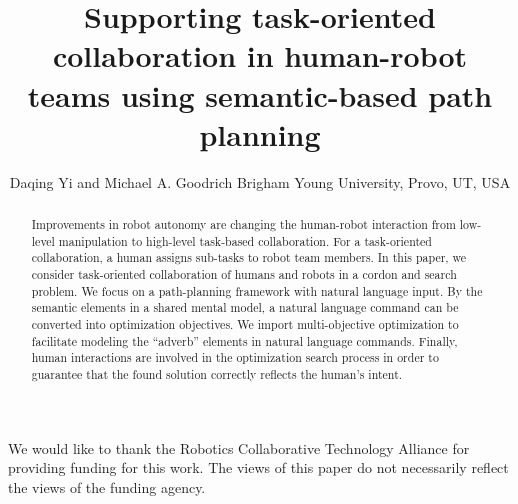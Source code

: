 \documentclass[]{spie}  %
\title{Supporting task-oriented collaboration in human-robot teams using semantic-based path planning}
\author{Daqing Yi and Michael A. Goodrich
\skiplinehalf
Brigham Young University, Provo, UT, USA 
}
\begin{document}
 
\maketitle

\begin{abstract}
Improvements in robot autonomy are changing the human-robot interaction from low-level manipulation to high-level task-based collaboration.
For a task-oriented collaboration, a human assigns sub-tasks to robot team members.
In this paper, we consider task-oriented collaboration of humans and robots in a cordon and search problem.
We focus on a path-planning framework with natural language input.
By the semantic elements in a shared mental model, a natural language command can be converted into optimization objectives.
We import multi-objective optimization to facilitate modeling the ``adverb'' elements in natural language commands.
Finally, human interactions are involved in the optimization search process in order to guarantee that the found solution correctly reflects the human's intent.
\end{abstract}












\acknowledgments     %
We would like to thank the Robotics Collaborative Technology Alliance for providing funding for this work.
The views of this paper do not necessarily reflect the views of the funding agency.

\end{document}

